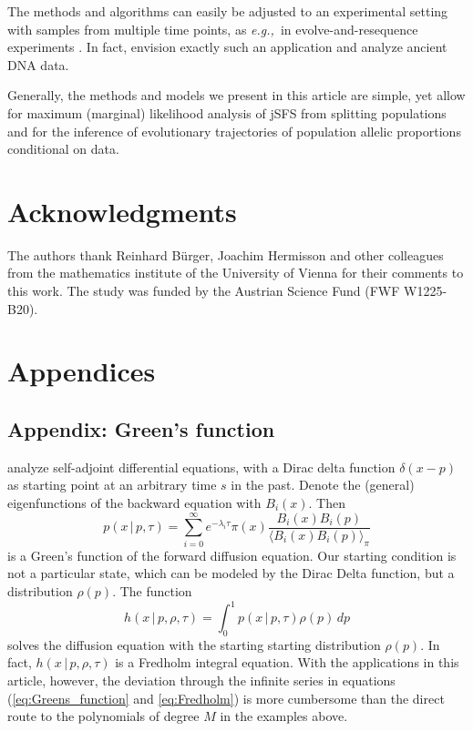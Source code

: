 \documentclass[preprint]{elsarticle}
\newcommand\given{{\,|\,}}
\newcommand\eg{{\it e.g.,}}
\begin{document}
The methods and algorithms can easily be adjusted to an experimental setting with samples from multiple time points, as \eg\ in evolve-and-resequence experiments \citep{Kofl14}. In fact, \citet{Stei14} envision exactly such an application and analyze ancient DNA data. 

Generally, the methods and models we present in this article are simple, yet allow for maximum (marginal) likelihood analysis of jSFS from splitting populations and for the inference of evolutionary trajectories of population allelic proportions conditional on data. 
 

\section*{Acknowledgments}

The authors thank Reinhard B\"urger, Joachim Hermisson and other colleagues from the mathematics institute of the University of Vienna for their comments to this work. The study was funded by the Austrian Science Fund (FWF W1225-B20). %

\section{Appendices}
\subsection{Appendix: Green's function}\label{section:Greens_function}

\citet{Song12} analyze self-adjoint differential equations, with a Dirac delta function $\delta(x-p)$ as starting point at an arbitrary time $s$ in the past. Denote the (general) eigenfunctions of the backward equation with $B_i(x)$. Then 
\begin{equation}\label{eq:Greens_function}
    p(x\given p,\tau)=\sum_{i=0}^\infty e^{-\lambda_i \tau}\pi(x) \frac{B_i(x)B_i(p)}{\langle B_i(x)B_i(p) \rangle_{\pi}}
\end{equation}
is a Green's function of the forward diffusion equation. %
Our starting condition is not a particular state, which can be modeled by the Dirac Delta function, but a distribution $\rho(p)$. The function 
\begin{equation}\label{eq:Fredholm}
    h(x\given p,\rho,\tau)=\int_0^1 p(x\given p,\tau)\rho(p)\,dp
\end{equation}
solves the diffusion equation with the starting starting distribution $\rho(p)$. In fact, $h(x\given p,\rho,\tau)$ is a Fredholm integral equation. %
With the applications in this article, however, the deviation through the infinite series in equations (\ref{eq:Greens_function} and \ref{eq:Fredholm}) is more cumbersome than the direct route to the polynomials of degree $M$ in the examples above. 
\end{document}
